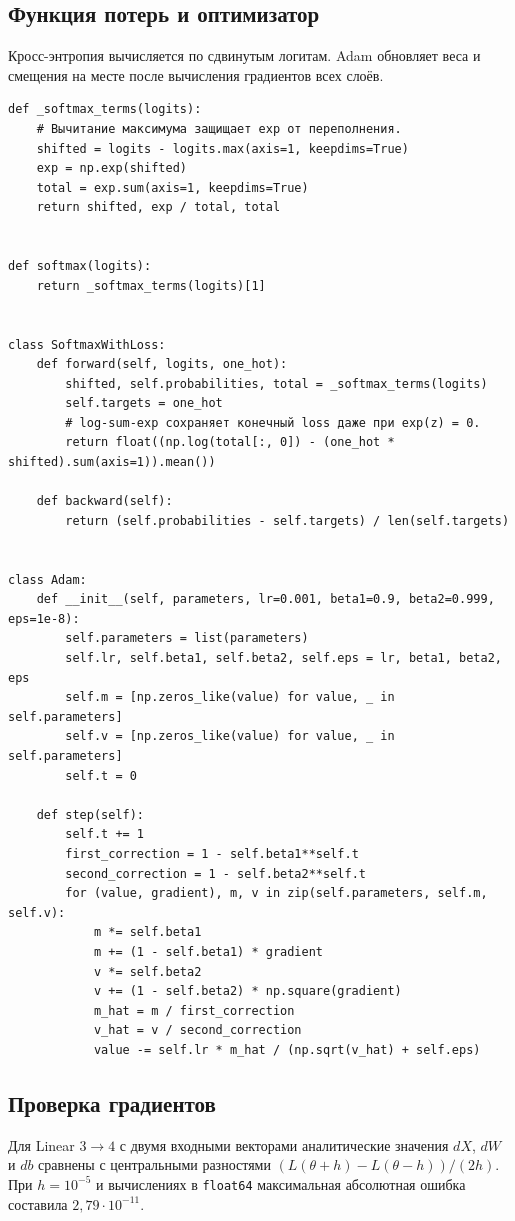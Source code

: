 \clearpage
\subsection{Функция потерь и оптимизатор}
Кросс-энтропия вычисляется по сдвинутым логитам. Adam обновляет веса и смещения на месте после вычисления градиентов всех слоёв.
{\codefont
\begin{verbatim}
def _softmax_terms(logits):
    # Вычитание максимума защищает exp от переполнения.
    shifted = logits - logits.max(axis=1, keepdims=True)
    exp = np.exp(shifted)
    total = exp.sum(axis=1, keepdims=True)
    return shifted, exp / total, total


def softmax(logits):
    return _softmax_terms(logits)[1]


class SoftmaxWithLoss:
    def forward(self, logits, one_hot):
        shifted, self.probabilities, total = _softmax_terms(logits)
        self.targets = one_hot
        # log-sum-exp сохраняет конечный loss даже при exp(z) = 0.
        return float((np.log(total[:, 0]) - (one_hot * shifted).sum(axis=1)).mean())

    def backward(self):
        return (self.probabilities - self.targets) / len(self.targets)


class Adam:
    def __init__(self, parameters, lr=0.001, beta1=0.9, beta2=0.999, eps=1e-8):
        self.parameters = list(parameters)
        self.lr, self.beta1, self.beta2, self.eps = lr, beta1, beta2, eps
        self.m = [np.zeros_like(value) for value, _ in self.parameters]
        self.v = [np.zeros_like(value) for value, _ in self.parameters]
        self.t = 0

    def step(self):
        self.t += 1
        first_correction = 1 - self.beta1**self.t
        second_correction = 1 - self.beta2**self.t
        for (value, gradient), m, v in zip(self.parameters, self.m, self.v):
            m *= self.beta1
            m += (1 - self.beta1) * gradient
            v *= self.beta2
            v += (1 - self.beta2) * np.square(gradient)
            m_hat = m / first_correction
            v_hat = v / second_correction
            value -= self.lr * m_hat / (np.sqrt(v_hat) + self.eps)

\end{verbatim}
}

\subsection{Проверка градиентов}
Для Linear \(3\to4\) с двумя входными векторами аналитические значения \(dX\), \(dW\) и \(db\) сравнены с центральными разностями \((L(\theta+h)-L(\theta-h))/(2h)\). При \(h=10^{-5}\) и вычислениях в \texttt{float64} максимальная абсолютная ошибка составила \(2{,}79\cdot10^{-11}\).


